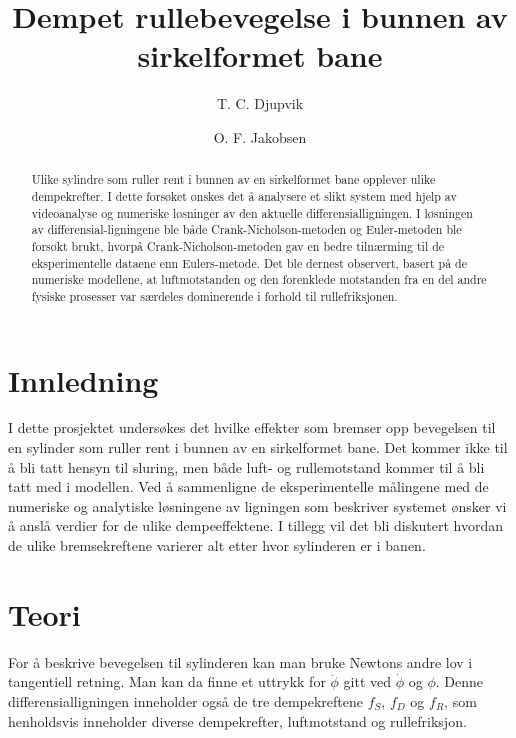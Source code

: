 \documentclass[5p]{elsarticle}
\title{Dempet rullebevegelse i bunnen av sirkelformet bane}
\author[fysikk]{T. C. Djupvik}
\author[fysikk]{O. F. Jakobsen}
\begin{document}
\begin{abstract}
Ulike sylindre som ruller rent i bunnen av en sirkelformet bane opplever ulike dempekrefter.
I dette forsøket ønskes det å analysere et slikt system med hjelp av videoanalyse og numeriske løsninger av den aktuelle differensial\-ligningen. I løsningen av differensial-ligningene ble både Crank-Nicholson-metoden og Euler-metoden ble forsøkt brukt, hvorpå Crank-Nicholson-metoden gav en bedre tilnærming til de eksperimentelle dataene enn Eulers-metode. Det ble dernest observert, basert på de numeriske modellene, at luftmotstanden og den forenklede motstanden fra en del andre fysiske prosesser var særdeles dominerende i forhold til rullefriksjonen.

\end{abstract}

\maketitle %

\section{Innledning}
I dette prosjektet undersøkes det hvilke effekter som bremser opp bevegelsen 
til en sylinder som ruller rent i bunnen av en sirkelformet bane. Det kommer ikke til å 
bli tatt hensyn til sluring, men både luft- og rullemotstand kommer til å bli tatt med i modellen.
Ved å sammenligne de eksperimentelle målingene med de numeriske og analytiske løsningene av 
ligningen som beskriver systemet ønsker vi å anslå verdier for de ulike dempeeffektene. 
I tillegg vil det bli diskutert hvordan de ulike bremsekreftene varierer alt etter hvor sylinderen 
er i banen.

\section{Teori}

For å beskrive bevegelsen til sylinderen kan man bruke Newtons andre lov i tangentiell retning.
Man kan da finne et uttrykk for \(\ddot{\phi}\) gitt ved \(\dot{\phi}\) og \(\phi\). 
Denne differensialligningen inneholder også de tre dempekreftene \(f_S\), \(f_D\) og \(f_R\), 
som henholdsvis inneholder diverse dempekrefter, luftmotstand og rullefriksjon.
\end{document}
